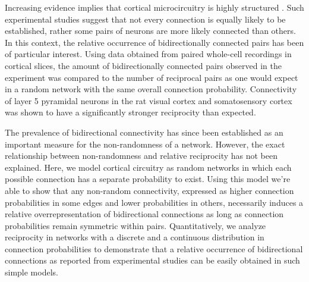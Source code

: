 

Increasing evidence implies that cortical microcircuitry is highly structured \cite{Song2005,Perin2011}. Such experimental studies suggest that not every connection is equally likely to be established, rather some pairs of neurons are more likely connected than others. In this context, the relative occurrence of bidirectionally connected pairs has been of particular interest. Using data obtained from paired whole-cell recordings in cortical slices, the amount of bidirectionally connected pairs observed in the experiment was compared to the number of reciprocal pairs as one would expect in a random network with the same overall connection probability. Connectivity of layer 5 pyramidal neurons in the rat visual cortex \cite{Song2005} and somatosensory cortex \cite{Markram1997, Perin2011} was shown to have a significantly stronger reciprocity than expected.



The prevalence of bidirectional connectivity has since been established as an important measure for the non-randomness of a network. However, the exact relationship between non-randomness and relative reciprocity has not been explained. Here, we model cortical circuitry as random networks in which each possible connection has a separate probability to exist. Using this model we're able to show that any non-random connectivity, expressed as higher connection probabilities in some edges and lower probabilities in others, necessarily induces a relative overrepresentation of bidirectional connections as long as connection probabilities remain symmetric within pairs. Quantitatively, we analyze reciprocity in networks with a discrete and a continuous distribution in connection probabilities to demonstrate that a relative occurrence of bidirectional connections as reported from experimental studies can be easily obtained in such simple models.


